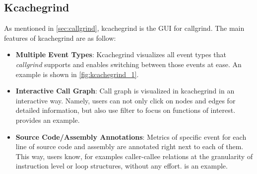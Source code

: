 \subsection{Kcachegrind}
\label{sec:kcachegrind}

As mentioned in \cref{sec:callgrind}, kcachegrind is the GUI for callgrind. The main features of kcachegrind are as follow:

\begin{itemize}
    \item \textbf{Multiple Event Types}: Kcachegrind visualizes all event types that \textit{callgrind} supports and enables switching between those events at ease. An example is shown in \cref{fig:kcachegrind_1}.
    
    \item \textbf{Interactive Call Graph}: Call graph is visualized in kcachegrind in an interactive way. Namely, users can not only click on nodes and edges for detailed information, but also use filter to focus on functions of interest.  provides an example.
    
    \item \textbf{Source Code/Assembly Annotations}: Metrics of specific event for each line of source code and assembly are annotated right next to each of them. This way, users know, for examples caller-callee relations at the granularity of instruction level or loop structures, without any effort.  is an example.
\end{itemize}

